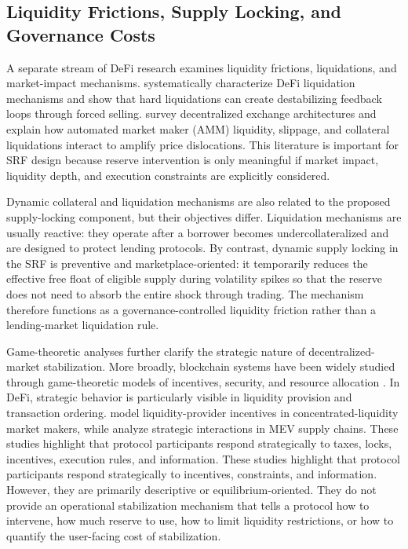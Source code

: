 \documentclass[a4paper,fleqn]{cas-dc}
\begin{document}
\subsection{Liquidity Frictions, Supply Locking, and Governance Costs}

A separate stream of DeFi research examines liquidity frictions, liquidations, and market-impact mechanisms. \citet{perez2021liquidations} systematically characterize DeFi liquidation mechanisms and show that hard liquidations can create destabilizing feedback loops through forced selling. \citet{xu2023sok} survey decentralized exchange architectures and explain how automated market maker (AMM) liquidity, slippage, and collateral liquidations interact to amplify price dislocations. This literature is important for SRF design because reserve intervention is only meaningful if market impact, liquidity depth, and execution constraints are explicitly considered.

Dynamic collateral and liquidation mechanisms are also related to the proposed supply-locking component, but their objectives differ. Liquidation mechanisms are usually reactive: they operate after a borrower becomes undercollateralized and are designed to protect lending protocols. By contrast, dynamic supply locking in the SRF is preventive and marketplace-oriented: it temporarily reduces the effective free float of eligible supply during volatility spikes so that the reserve does not need to absorb the entire shock through trading. The mechanism therefore functions as a governance-controlled liquidity friction rather than a lending-market liquidation rule.

Game-theoretic analyses further clarify the strategic nature of decentralized-market stabilization. More broadly, blockchain systems have been widely studied through game-theoretic models of incentives, security, and resource allocation \citep{liu2019blockchain_game}. In DeFi, strategic behavior is particularly visible in liquidity provision and transaction ordering. \citet{defi_pools_game_theory} model liquidity-provider incentives in concentrated-liquidity market makers, while \citet{mev_game_theory} analyze strategic interactions in MEV supply chains. These studies highlight that protocol participants respond strategically to taxes, locks, incentives, execution rules, and information. These studies highlight that protocol participants respond strategically to incentives, constraints, and information. However, they are primarily descriptive or equilibrium-oriented. They do not provide an operational stabilization mechanism that tells a protocol how to intervene, how much reserve to use, how to limit liquidity restrictions, or how to quantify the user-facing cost of stabilization.
\end{document}
